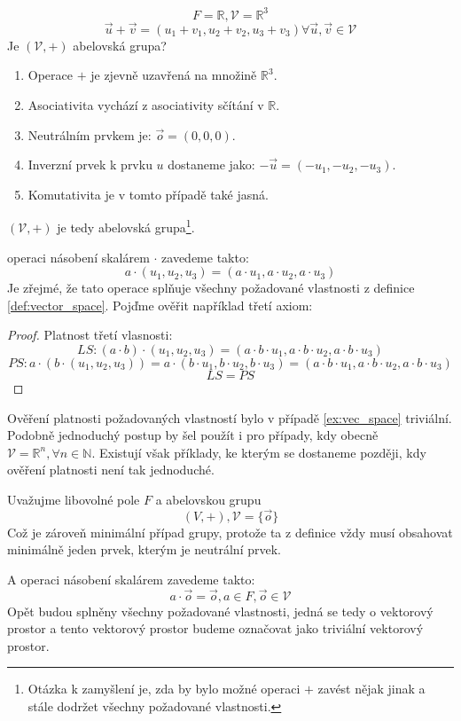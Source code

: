 \begin{example}
    $$F = \mathbb{R}, \mathcal{V} = \mathbb{R}^3$$
    $$\vec{u} + \vec{v} = (u_1 + v_1, u_2 + v_2, u_3 + v_3)
    \forall \vec{u}, \vec{v} \in \mathcal{V}$$
    Je $(\mathcal{V}, +)$ abelovská grupa?
    \begin{enumerate}[start=0]
        \item Operace $+$ je zjevně uzavřená na množině $\mathbb{R}^3$.
        \item Asociativita vychází z asociativity sčítání v $\mathbb{R}$.
        \item Neutrálním prvkem je: $\vec{o} = (0, 0, 0)$.
        \item Inverzní prvek k prvku $u$ dostaneme jako: $-\vec{u} = (-u_1, -u_2, -u_3)$.
        \item Komutativita je v tomto případě také jasná.
    \end{enumerate}
    $(\mathcal{V}, +)$ je tedy abelovská grupa\footnote{Otázka k zamyšlení je, zda by bylo
    možné operaci $+$ zavést nějak jinak a stále dodržet všechny požadované vlastnosti.}.

    operaci násobení skalárem $\cdot$ zavedeme takto:
    $$a \cdot (u_1, u_2, u_3) = (a \cdot u_1, a \cdot u_2, a \cdot u_3)$$
    Je zřejmé, že tato operace splňuje všechny požadované vlastnosti z definice
    \ref{def:vector_space}. Pojďme ověřit například třetí axiom:
    \begin{proof} Platnost třetí vlasnosti:
        $$LS: (a \cdot b) \cdot (u_1, u_2, u_3) =
        (a \cdot b \cdot u_1, a \cdot b \cdot u_2, a \cdot b \cdot u_3)$$
        $$PS: a\cdot (b \cdot (u_1, u_2, u_3)) = a \cdot (b \cdot u_1, b \cdot u_2, b \cdot u_3) =
        (a \cdot b \cdot u_1, a \cdot b \cdot u_2, a \cdot b \cdot u_3)$$
        $$LS = PS$$
    \end{proof}
    \label{ex:vec_space}
\end{example}

Ověření platnosti požadovaných vlastností bylo v případě \ref{ex:vec_space} triviální.
Podobně jednoduchý postup by šel použít i pro případy, kdy obecně
$\mathcal{V} = \mathbb{R}^n, \forall n \in \mathbb{N}$. Existují však příklady, ke kterým
se dostaneme později, kdy ověření platnosti není tak jednoduché.

\begin{definition}
    Uvažujme libovolné pole $F$ a abelovskou grupu
    $$(V, +), \mathcal{V} = \{\vec{o}\}$$
    Což je zároveň minimální případ grupy, protože ta z definice vždy musí
    obsahovat minimálně jeden prvek, kterým je neutrální prvek.

    A operaci násobení skalárem zavedeme takto:
    $$a \cdot \vec{o} = \vec{o}, a \in F, \vec{o} \in \mathcal{V}$$
    Opět budou splněny všechny požadované vlastnosti, jedná se tedy o vektorový prostor
    a tento vektorový prostor budeme označovat jako triviální vektorový prostor.
\end{definition}


